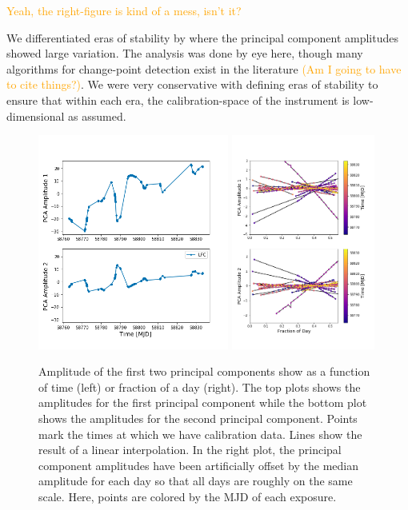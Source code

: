 \documentclass[12pt, onecolumn]{aastex63}
\newcommand{\lz}[1]{\textcolor{orange}{#1}}
\begin{document}
\lz{Yeah, the right-figure is kind of a mess, isn't it?}

We differentiated eras of stability by where the principal component amplitudes showed large variation.  The analysis was done by eye here, though many algorithms for change-point detection exist in the literature \lz{(Am I going to have to cite things?)}.  We were very conservative with defining eras of stability to ensure that within each era, the calibration-space of the instrument is low-dimensional as assumed.

\begin{figure}[h!]
\centering
\includegraphics[width=0.56\textwidth]{Figures/pcA_lfc.png}
\includegraphics[width=0.42\textwidth]{Figures/pcAs_byDay.png}
\caption{Amplitude of the first two principal components show as a function of time (left) or fraction of a day (right).  The top plots shows the amplitudes for the first principal component while the bottom plot shows the amplitudes for the second principal component.  Points mark the times at which we have calibration data.  Lines show the result of a linear interpolation.  In the right plot, the principal component amplitudes have been artificially offset by the median amplitude for each day so that all days are roughly on the same scale.  Here, points are colored by the MJD of each exposure.}
\label{fig:nightlyVariation}
\end{figure} 
\end{document}
